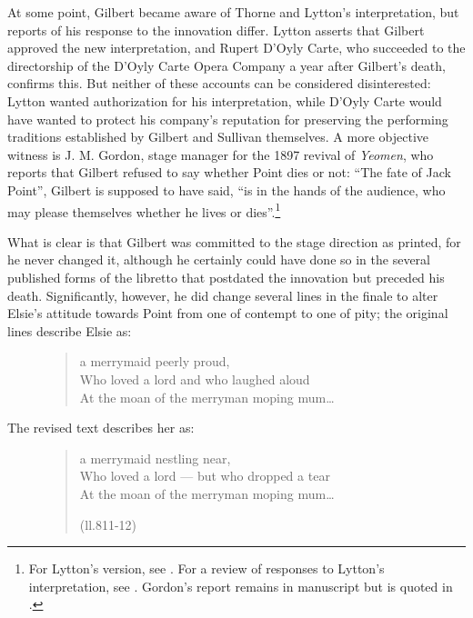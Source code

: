 \begin{paper}
At some point, Gilbert became aware of Thorne and Lytton's
interpretation, but reports of his response to the innovation differ.
Lytton asserts that Gilbert approved the new interpretation, and Rupert
D'Oyly Carte, who succeeded to the directorship of the D'Oyly Carte
Opera Company a year after Gilbert's death, confirms this. But neither
of these accounts can be considered disinterested: Lytton wanted
authorization for his interpretation, while D'Oyly Carte would have
wanted to protect his company's reputation for preserving the performing
traditions established by Gilbert and Sullivan themselves. A more
objective witness is J. M. Gordon, stage manager for the 1897 revival of
\emph{Yeomen}, who reports that Gilbert refused to say whether Point
dies or not: ``The fate of Jack Point'', Gilbert is supposed to have
said, ``is in the hands of the audience, who may please themselves
whether he lives or dies''.\footnote{For Lytton's version, see \citealt[174]{lytton_secrets_1922}. For a review of responses to Lytton's interpretation, see \citealt[319--22]{bailey_gilbert_1952}. Gordon's report remains in manuscript but is quoted in \citealt[514]{bradley_ian_complete_1996}.}

What is clear is that Gilbert was committed to the stage direction as
printed, for he never changed it, although he certainly could have done
so in the several published forms of the libretto that postdated the
innovation but preceded his death. Significantly, however, he did change
several lines in the finale to alter Elsie's attitude towards Point from
one of contempt to one of pity; the original lines describe Elsie as:

\begin{figure}[H]
\begin{quote}
\-\hspace{1cm}a merrymaid peerly proud,\\
Who loved a lord and who laughed aloud\\
At the moan of the merryman moping mum\ldots{}
\end{quote}
\end{figure}

\newpage
\noindent The revised text describes her as:

\begin{figure}[H]
\begin{quote}
\-\hspace{1cm}a merrymaid nestling near,\\
Who loved a lord --- but who dropped a tear\\
At the moan of the merryman moping mum\ldots{}
\begin{flushright}
(ll.811-12)
\end{flushright}
\end{quote}
\end{figure}



\end{paper}
